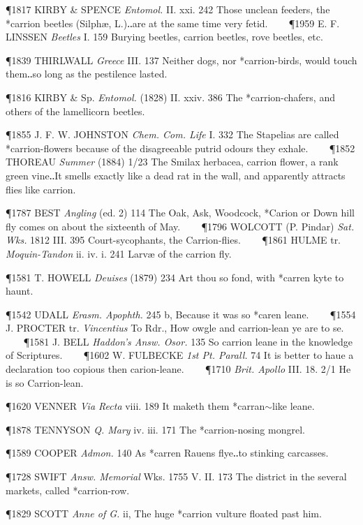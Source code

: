 \begin{description}[wide, labelwidth=!, labelindent=0pt]
\begin{myenumerate}
\P 1817 KIRBY  \& SPENCE \textit{Entomol.} II. xxi. 242 Those unclean feeders, the *carrion beetles (Silphæ, L.)‥are at the same time very fetid.    
\P 1959 E. F. LINSSEN  \textit{Beetles} I. 159 Burying beetles, carrion beetles, rove beetles, etc.

\P 1839 THIRLWALL  \textit{Greece} III. 137 Neither dogs, nor *carrion-birds, would touch them‥so long as the pestilence lasted.

\P 1816 KIRBY  \& Sp. \textit{Entomol.} (1828) II. xxiv. 386 The *carrion-chafers, and others of the lamellicorn beetles.

\P 1855 J. F. W.  JOHNSTON \textit{Chem. Com. Life} I. 332 The Stapelias are called *carrion-flowers because of the disagreeable putrid odours they exhale.    
\P 1852 THOREAU  \textit{Summer} (1884) 1/23 The Smilax herbacea, carrion flower, a rank green vine‥It smells exactly like a dead rat in the wall, and apparently attracts flies like carrion.

\P 1787 BEST  \textit{Angling} (ed. 2) 114 The Oak, Ask, Woodcock, *Carion or Down hill fly comes on about the sixteenth of May.    
\P 1796 WOLCOTT  (P. Pindar) \textit{Sat. Wks.} 1812 III. 395 Court-sycophants, the Carrion-flies.    
\P 1861 HULME tr. \textit{Moquin-Tandon} ii. iv. i. 241 Larvæ of the carrion fly.

\P 1581 T. HOWELL  \textit{Deuises} (1879) 234 Art thou so fond, with *carren kyte to haunt.

\P 1542 UDALL  \textit{Erasm. Apophth.} 245 b, Because it was so *caren leane.    
\P 1554 J. PROCTER tr. \textit{Vincentius} To Rdr., How owgle and carrion-lean ye are to se.    
\P 1581 J. BELL  \textit{Haddon's Answ. Osor.} 135 So carrion leane in the knowledge of Scriptures.    
\P 1602 W. FULBECKE  \textit{1st Pt. Parall.} 74 It is better to haue a declaration too copious then carion-leane.    
\P 1710  \textit{Brit. Apollo} III. 18. 2/1 He is so Carrion-lean.

\P 1620 VENNER  \textit{Via Recta} viii. 189 It maketh them *carran$\sim$like leane.

\P 1878 TENNYSON  \textit{Q. Mary} iv. iii. 171 The *carrion-nosing mongrel.

\P 1589 COOPER  \textit{Admon.} 140 As *carren Rauens flye‥to stinking carcasses.

\P 1728 SWIFT  \textit{Answ. Memorial} Wks. 1755 V. II. 173 The district in the several markets, called *carrion-row.

\P 1829 SCOTT  \textit{Anne of G.} ii, The huge *carrion vulture floated past him.
\end{myenumerate}



\end{description}
